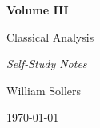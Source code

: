 \begin{titlepage}
\centering

\vspace*{5cm}

{\Huge\bfseries Volume III\par}

\vspace{0.5cm}

{\LARGE Classical Analysis\par}

\vspace{0.5cm}

{\large\itshape Self-Study Notes\par}

\vfill

{\large William Sollers\par}

\vspace{0.5cm}

{\large \today\par}

\end{titlepage}
